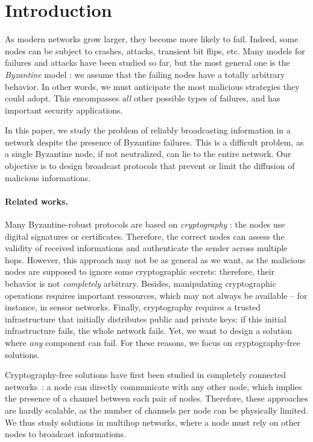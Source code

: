 \documentclass[a4paper,11pt]{article}
\begin{document}
\vspace{7mm}





\section{Introduction}

As modern networks grow larger, they become more likely to fail. Indeed, some nodes can be subject to crashes, attacks, transient bit flips, etc.
Many models for failures and attacks have been studied so far, but the most general one is the \emph{Byzantine} model \cite{LSP82j}: we assume that the failing nodes have a totally arbitrary behavior. In other words, we must anticipate the most malicious strategies they could adopt. This encompasses \emph{all} other possible types of failures, and has important security applications.

In this paper, we study the problem of reliably broadcasting information in a network despite the presence of Byzantine failures. This is a difficult problem, as a single Byzantine node, if not neutralized, can lie to the entire network. Our objective is to design broadcast protocols that prevent or limit the diffusion of malicious informations.

\paragraph{Related works.}

Many Byzantine-robust protocols are based on \emph{cryptography} \cite{CL99c,DFS05c}: the nodes use digital signatures or certificates. Therefore, the correct nodes can assess the validity of received informations and authenticate the sender across multiple hops. However, this approach may not be as general as we want, as the malicious nodes are supposed to ignore some cryptographic secrets: therefore, their behavior is not \emph{completely} arbitrary.
Besides, manipulating cryptographic operations requires important ressources, which may not always be available -- for instance, in sensor networks.
Finally, cryptography requires a trusted infrastructure that initially distributes public and private keys: if this initial infrastructure fails, the whole network fails. Yet, we want to design a solution where \emph{any} component can fail. 
For these reasons, we focus on cryptography-free solutions.

Cryptography-free solutions have first been studied in completely connected networks~\cite{LSP82j,AW98b,MMR03j,MRRS01c,MS03j}: a node can directly communicate with any other node, which implies the presence of a channel between each pair of nodes. Therefore, these approaches are hardly scalable, as the number of channels per node can be physically limited. We thus study solutions in multihop networks, where a node must rely on other nodes to broadcast informations.
\end{document}

